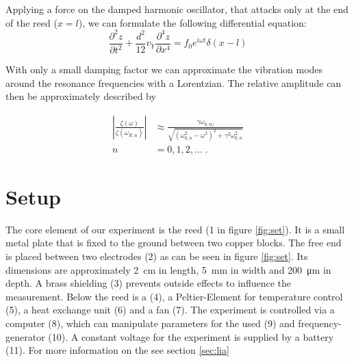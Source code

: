 \documentclass[twoside, a4paper, DIV=11,twocolumn, 12pt]{book}
\begin{document}
Applying a force on the damped harmonic oscillator, that attacks only at the end of the reed ($x = l$), we can formulate the following differential equation:
\begin{equation}
 \frac{\partial^2z}{\partial t^2} + \frac{d^2}{12} v_Y \frac{\partial^4z}{\partial x^4} = f_0 e^{i\omega t}\delta(x - l)
\end{equation}

With only a small damping factor we can approximate the vibration modes around the resonance frequencies with a Lorentzian.
The relative amplitude can then be approximately described by 

\begin{align}
 \left| \frac{\zeta(\omega)}{\zeta(\omega_{R,n})} \right| &\approx \frac{\gamma \omega_{0,n)}}{\sqrt{(\omega_{0,n}^2 - \omega^2)^2 + \gamma^2\omega_{0,n}^2}} \\
 n &= 0, 1, 2,\dots \; \text{.}
\end{align}






\chapter{Setup}
\label{sec:set}


The core element of our experiment is the reed (1 in figure \ref{fig:set}).  It is a small metal plate that is fixed to the ground between two copper blocks.
The free end is placed between two electrodes (2) as can be seen in figure \ref{fig:set}. Its dimensions are approximately 
\SI{2}{\centi\meter} in length, \SI{5}{\milli\meter} in width and \SI{200}{\micro\meter} in depth. A brass shielding (3) prevents outside effects to influence the measurement.
Below the reed is a  (4), a Peltier-Element for temperature control (5), a heat exchange unit (6) and a fan (7). 
The experiment is controlled via a computer (8), which can manipulate parameters for the used \LIA (9) and frequency-generator (10). A constant voltage for the experiment is supplied by a battery (11).
For more information on the \LIA see section \ref{sec:lia}
\end{document}
